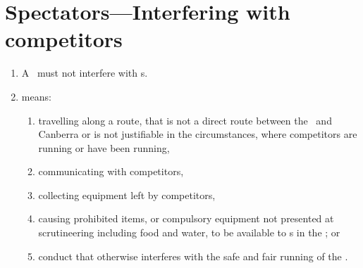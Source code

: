 \documentclass[12pt]{report}
\begin{document}
   \section{Spectators---Interfering with competitors}
  \begin{enumerate}
    \item A \spectator\ must not interfere with \competitor s.

    \item {} means:
    \begin{enumerate}
      \item travelling along a route, that is not a direct route between the \Endpoint\ and Canberra or is not justifiable in the circumstances, where competitors are running or have been running,
      \item communicating with competitors,
      \item collecting equipment left by competitors,
      \item causing prohibited items, or compulsory equipment not presented at scrutineering including food and water, to be available to \competitor s in the \coursearea; or
      \item conduct that otherwise interferes with the safe and fair running of the \race.
    \end{enumerate}
  \end{enumerate}
\end{document}
